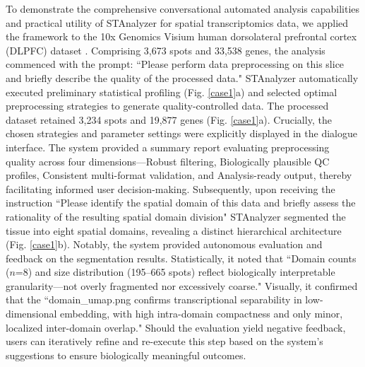 \documentclass[a4,center,fleqn]{NAR}
\begin{document}



To demonstrate the comprehensive conversational automated analysis capabilities and practical utility of STAnalyzer for spatial transcriptomics data, we applied the framework to the 10x Genomics Visium human dorsolateral prefrontal cortex (DLPFC) dataset \cite{maynard2021transcriptome}. Comprising 3,673 spots and 33,538 genes, the analysis commenced with the prompt: ``Please perform data preprocessing on this slice and briefly describe the quality of the processed data." STAnalyzer automatically executed preliminary statistical profiling (Fig. \ref{case1}a) and selected optimal preprocessing strategies to generate quality-controlled data. The processed dataset retained 3,234 spots and 19,877 genes (Fig. \ref{case1}a). Crucially, the chosen strategies and parameter settings were explicitly displayed in the dialogue interface. The system provided a summary report evaluating preprocessing quality across four dimensions—Robust filtering, Biologically plausible QC profiles, Consistent multi-format validation, and Analysis-ready output, thereby facilitating informed user decision-making. Subsequently, upon receiving the instruction ``Please identify the spatial domain of this data and briefly assess the rationality of the resulting spatial domain division" STAnalyzer segmented the tissue into eight spatial domains, revealing a distinct hierarchical architecture (Fig. \ref{case1}b). Notably, the system provided autonomous evaluation and feedback on the segmentation results. Statistically, it noted that ``Domain counts ($n$=8) and size distribution (195–665 spots) reflect biologically interpretable granularity—not overly fragmented nor excessively coarse." Visually, it confirmed that the ``domain\_umap.png confirms transcriptional separability in low-dimensional embedding, with high intra-domain compactness and only minor, localized inter-domain overlap." Should the evaluation yield negative feedback, users can iteratively refine and re-execute this step based on the system's suggestions to ensure biologically meaningful outcomes.
\end{document}
